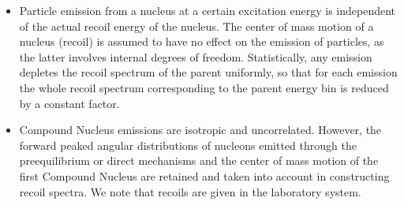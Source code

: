 \begin{itemize}
\item Particle emission from a nucleus at a certain excitation energy is
independent of the actual recoil energy of the nucleus. The center of mass
motion of a nucleus (recoil) is assumed to have no effect on the emission of
particles, as the latter involves internal degrees of freedom.
Statistically, any emission depletes the recoil spectrum of the parent
uniformly, so that for each emission the whole recoil spectrum corresponding
to the parent energy bin is reduced by a constant factor.

\item Compound Nucleus emissions are isotropic and uncorrelated.
However, the forward peaked angular distributions of nucleons emitted
through the preequilibrium or direct mechanisms and the center of mass
motion of the first Compound Nucleus are retained and taken into account in
constructing recoil spectra. We note that recoils are given in the
laboratory system.
\end{itemize}

